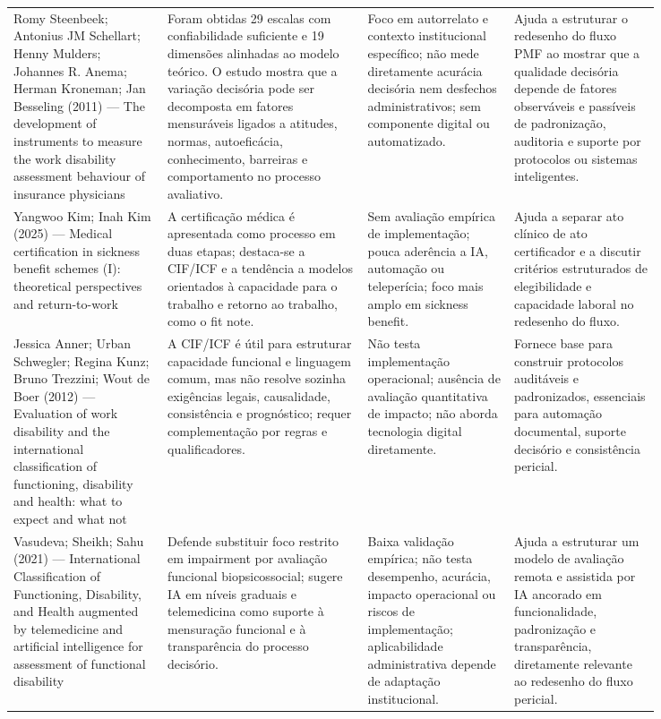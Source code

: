 \documentclass[12pt,a4paper]{article}
\begin{document}
\begin{landscape}
\begin{longtable}{p{0.20\linewidth}p{0.26\linewidth}p{0.19\linewidth}p{0.19\linewidth}}
Romy Steenbeek; Antonius JM Schellart; Henny Mulders; Johannes R. Anema; Herman Kroneman; Jan Besseling (2011) — The development of instruments to measure the work disability assessment behaviour of insurance physicians & Foram obtidas 29 escalas com confiabilidade suficiente e 19 dimensões alinhadas ao modelo teórico. O estudo mostra que a variação decisória pode ser decomposta em fatores mensuráveis ligados a atitudes, normas, autoeficácia, conhecimento, barreiras e comportamento no processo avaliativo. & Foco em autorrelato e contexto institucional específico; não mede diretamente acurácia decisória nem desfechos administrativos; sem componente digital ou automatizado. & Ajuda a estruturar o redesenho do fluxo PMF ao mostrar que a qualidade decisória depende de fatores observáveis e passíveis de padronização, auditoria e suporte por protocolos ou sistemas inteligentes.\\
Yangwoo Kim; Inah Kim (2025) — Medical certification in sickness benefit schemes (I): theoretical perspectives and return-to-work & A certificação médica é apresentada como processo em duas etapas; destaca-se a CIF/ICF e a tendência a modelos orientados à capacidade para o trabalho e retorno ao trabalho, como o fit note. & Sem avaliação empírica de implementação; pouca aderência a IA, automação ou teleperícia; foco mais amplo em sickness benefit. & Ajuda a separar ato clínico de ato certificador e a discutir critérios estruturados de elegibilidade e capacidade laboral no redesenho do fluxo.\\
Jessica Anner; Urban Schwegler; Regina Kunz; Bruno Trezzini; Wout de Boer (2012) — Evaluation of work disability and the international classification of functioning, disability and health: what to expect and what not & A CIF/ICF é útil para estruturar capacidade funcional e linguagem comum, mas não resolve sozinha exigências legais, causalidade, consistência e prognóstico; requer complementação por regras e qualificadores. & Não testa implementação operacional; ausência de avaliação quantitativa de impacto; não aborda tecnologia digital diretamente. & Fornece base para construir protocolos auditáveis e padronizados, essenciais para automação documental, suporte decisório e consistência pericial.\\
Vasudeva; Sheikh; Sahu (2021) — International Classification of Functioning, Disability, and Health augmented by telemedicine and artificial intelligence for assessment of functional disability & Defende substituir foco restrito em impairment por avaliação funcional biopsicossocial; sugere IA em níveis graduais e telemedicina como suporte à mensuração funcional e à transparência do processo decisório. & Baixa validação empírica; não testa desempenho, acurácia, impacto operacional ou riscos de implementação; aplicabilidade administrativa depende de adaptação institucional. & Ajuda a estruturar um modelo de avaliação remota e assistida por IA ancorado em funcionalidade, padronização e transparência, diretamente relevante ao redesenho do fluxo pericial.\\

\end{longtable}
\end{landscape}
\end{document}
